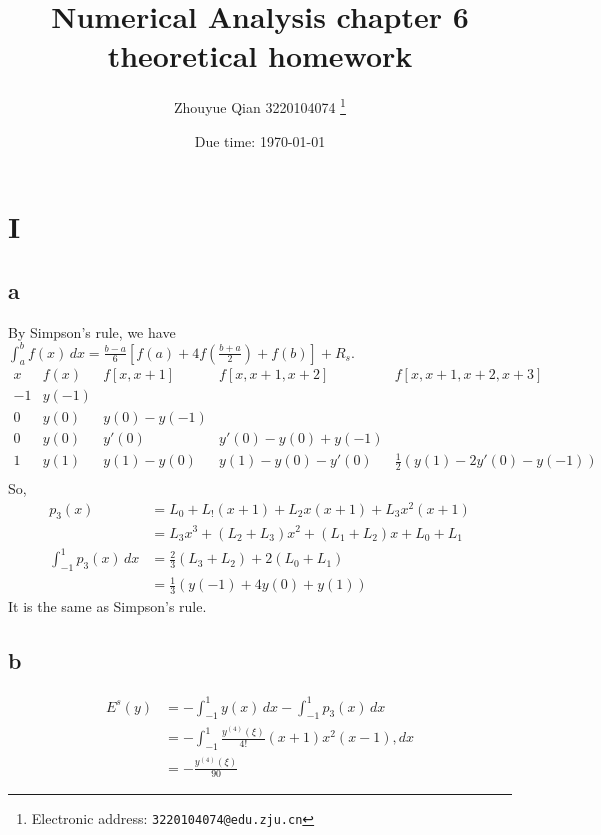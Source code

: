 \documentclass[a4paper]{article}
\begin{document}
\title{Numerical Analysis chapter 6 theoretical homework}

\author{Zhouyue Qian 3220104074
  \thanks{Electronic address: \texttt{3220104074@edu.zju.cn}}}


\date{Due time: \today}

\maketitle


\section*{I}
\subsection*{a}
By Simpson's rule, we have $\int_{a}^{b} f(x) \,dx = \frac{b-a}{6}[f(a)+4f(\frac{b+a}{2})+f(b)]+R_s$.
\[
\begin{array}{c|cccc}
x & f(x) & f[x, x+1] & f[x, x+1, x+2] & f[x, x+1, x+2, x+3] \\
\hline
-1 & y(-1) & & & \\
0 & y(0) & y(0) -y(-1)  & & \\
0 & y(0) & y'(0) & y'(0) -y(0) +y(-1)& \\
1 & y(1) & y(1)-y(0) & y(1)-y(0) -y'(0)& \frac{1}{2}(y(1)-2y'(0)-y(-1))\\
\end{array}
\]
So,
\begin{align*}
  p_3(x) &= L_0+L_!(x+1)+L_2x(x+1)+L_3x^2(x+1)\\
  &=L_3x^3+(L_2+L_3)x^2+(L_1+L_2)x+L_0+L_1\\
  \int_{-1}^{1} p_3(x) \,dx & = \frac{2}{3}(L_3+L_2)+2(L_0+L_1)\\
  &=\frac{1}{3}(y(-1)+4y(0)+y(1))
\end{align*}
It is the same as Simpson's rule.
\subsection*{b}
\begin{align*}
  E^s(y) &= -\int_{-1}^{1} y(x) \,dx - \int_{-1}^{1} p_3(x) \,dx\\
  &=-\int_{-1}^{1} \frac{y^{(4)}(\xi )}{4!}(x+1)x^2(x-1),dx \\
  &=-\frac{y^{(4)}(\xi )}{90}
\end{align*}
\end{document}
